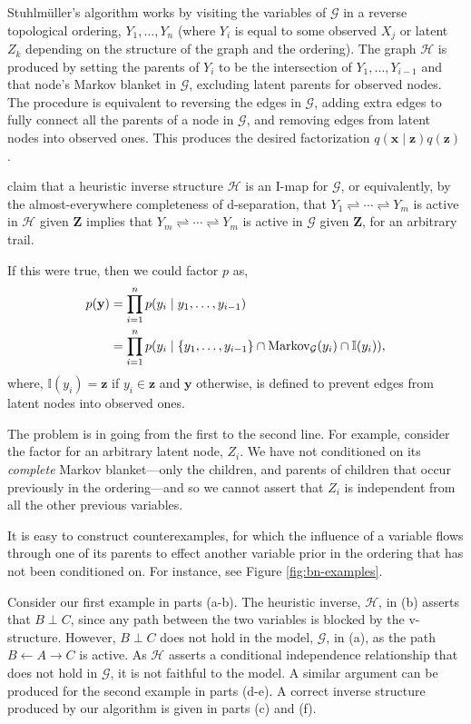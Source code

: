 \documentclass{article}
\begin{document}
Stuhlm\"{u}ller's algorithm works by visiting the variables of $\mathcal{G}$ in a reverse topological ordering, $Y_1,\ldots,Y_n$ (where $Y_i$ is equal to some observed $X_j$ or latent $Z_k$ depending on the structure of the graph and the ordering).
The graph $\mathcal{H}$ is produced by setting the parents of $Y_i$ to be the intersection of $Y_1,\ldots,Y_{i-1}$ and that node's Markov blanket in $\mathcal{G}$, excluding latent parents for observed nodes.
The procedure is equivalent to reversing the edges in $\mathcal{G}$, adding extra edges to fully connect all the parents of a node in $\mathcal{G}$, and removing edges from latent nodes into observed ones.
This produces the desired factorization $q(\mathbf{x}\mid\mathbf{z})q(\mathbf{z})$.

\citet{PaigeWood2016} claim that a heuristic inverse structure $\mathcal{H}$ is an I-map for $\mathcal{G}$, or equivalently, by the almost-everywhere completeness of d-separation, that $Y_1\rightleftharpoons\cdots\rightleftharpoons Y_m$ is active in $\mathcal{H}$ given $\mathbf{Z}$ implies that $Y_m\rightleftharpoons\cdots\rightleftharpoons Y_m$ is active in $\mathcal{G}$ given $\mathbf{Z}$, for an arbitrary trail.

If this were true, then we could factor $p$ as,
\begin{align*}
  p(\mathbf{y})
  &= \prod_{i=1}^np(y_i\mid y_1,\ldots,y_{i-1})\\
  &= \prod_{i=1}^np(y_i\mid \{y_1,\ldots,y_{i-1}\}
    \cap \textnormal{Markov}_\mathcal{G}(y_i)
    \cap \mathbb{I}(y_i)),
\end{align*}
where, $\mathbb{I}(y_i)=\mathbf{z}$ if $y_i\in\mathbf{z}$ and $\mathbf{y}$ otherwise, is defined to prevent edges from latent nodes into observed ones.

The problem is in going from the first to the second line.
For example, consider the factor for an arbitrary latent node, $Z_i$.
We have not conditioned on its \emph{complete} Markov blanket---only the children, and parents of children that occur previously in the ordering---and so we cannot assert that $Z_i$ is independent from all the other previous variables.

It is easy to construct counterexamples, for which the influence of a variable flows through one of its parents to effect another variable prior in the ordering that has not been conditioned on.
For instance, see Figure \ref{fig:bn-examples}.

Consider our first example in parts (a-b). The heuristic inverse, $\mathcal{H}$, in (b) asserts that $B\perp C$, since any path between the two variables is blocked by the v-structure. However, $B\perp C$ does not hold in the model, $\mathcal{G}$, in (a), as the path $B\leftarrow A\rightarrow C$ is active. As $\mathcal{H}$ asserts a conditional independence relationship that does not hold in $\mathcal{G}$, it is not faithful to the model. A similar argument can be produced for the second example in parts (d-e). A correct inverse structure produced by our algorithm is given in parts (c) and (f).
\end{document}
